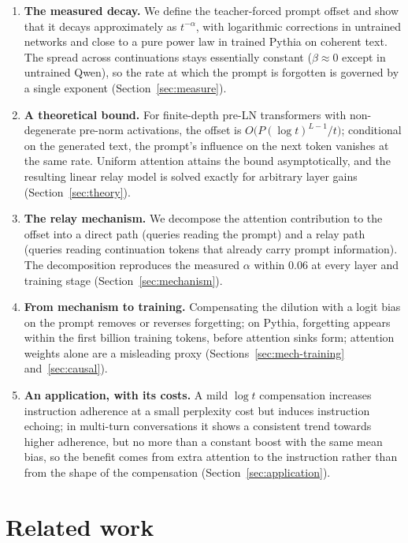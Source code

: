 \documentclass[11pt]{article}
\theoremstyle{definition}
\theoremstyle{remark}
\begin{document}
\begin{enumerate}
  \item \textbf{The measured decay.} We define the teacher-forced prompt offset and show that it decays approximately as $t^{-\alpha}$, with logarithmic corrections in untrained networks and close to a pure power law in trained Pythia on coherent text. The spread across continuations stays essentially constant ($\beta\approx 0$ except in untrained Qwen), so the rate at which the prompt is forgotten is governed by a single exponent (Section~\ref{sec:measure}).
  \item \textbf{A theoretical bound.} For finite-depth pre-LN transformers with non-degenerate pre-norm activations, the offset is $O\big(P(\log t)^{L-1}/t\big)$; conditional on the generated text, the prompt's influence on the next token vanishes at the same rate. Uniform attention attains the bound asymptotically, and the resulting linear relay model is solved exactly for arbitrary layer gains (Section~\ref{sec:theory}).
  \item \textbf{The relay mechanism.} We decompose the attention contribution to the offset into a direct path (queries reading the prompt) and a relay path (queries reading continuation tokens that already carry prompt information). The decomposition reproduces the measured $\alpha$ within $0.06$ at every layer and training stage (Section~\ref{sec:mechanism}).
  \item \textbf{From mechanism to training.} Compensating the dilution with a logit bias on the prompt removes or reverses forgetting; on Pythia, forgetting appears within the first billion training tokens, before attention sinks form; attention weights alone are a misleading proxy (Sections~\ref{sec:mech-training} and~\ref{sec:causal}).
  \item \textbf{An application, with its costs.} A mild $\log t$ compensation increases instruction adherence at a small perplexity cost but induces instruction echoing; in multi-turn conversations it shows a consistent trend towards higher adherence, but no more than a constant boost with the same mean bias, so the benefit comes from extra attention to the instruction rather than from the shape of the compensation (Section~\ref{sec:application}).
\end{enumerate}
\section{Related work}
\label{sec:related}
\end{document}
